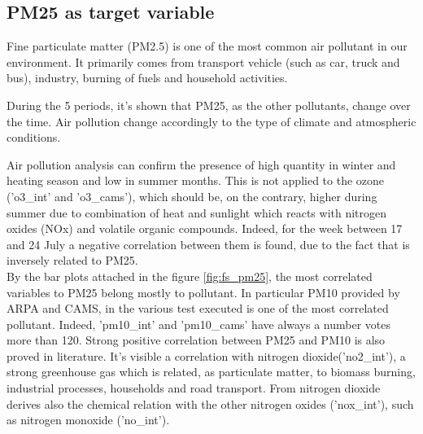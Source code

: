 \subsection{PM25 as target variable}
Fine particulate matter (PM2.5) is one of the most common air pollutant in our environment. 
It primarily comes from transport vehicle (such as car, truck and bus), industry, burning of fuels and household activities.\\ \par
During the 5 periods, it's shown that PM25, as the other pollutants, change over the time. Air pollution change accordingly to the type of climate and atmospheric conditions.\\

Air pollution analysis can confirm the presence of high quantity in winter and heating season and low in summer months\cite{cichowicz2017dispersion}. This is not applied to the ozone ('o3\_int' and 'o3\_cams'), which should be, on the contrary, higher during summer due to combination of heat and sunlight which reacts with nitrogen oxides (NOx) and volatile organic compounds. Indeed, for the week between 17 and 24 July a negative correlation between them is found, due to the fact that is inversely related to PM25.\\
By the bar plots attached in the figure \ref{fig:fs_pm25}, the most correlated variables to PM25 belong mostly to pollutant. In particular PM10 provided by ARPA and CAMS, in the various test executed is one of the most correlated pollutant. Indeed, 'pm10\_int' and 'pm10\_cams' have always a number votes more than 120. Strong positive correlation between PM25 and PM10 is also proved in literature\cite{zhou2016concentrations}. 
It's visible a correlation with nitrogen dioxide('no2\_int'), a strong greenhouse gas which is related, as particulate matter, to biomass burning, industrial processes, households and road transport\cite{zellner2000john}\cite{maranzano2022air}.
From nitrogen dioxide derives also the chemical relation with the other nitrogen oxides ('nox\_int'), such as nitrogen monoxide ('no\_int').
